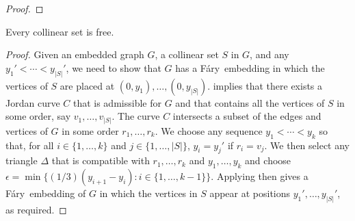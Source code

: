 \documentclass{patmorin}
\newcommand{\Fary}{Fáry}
\begin{document}
\begin{proof}
%
\end{proof}

\begin{cor}
  Every collinear set is free.
\end{cor}

\begin{proof}
   Given an embedded graph $G$, a collinear set $S$ in $G$,
   and any $y_1'<\cdots<y_{|S|}'$, we need to show that $G$ has
   a \Fary\ embedding in which the vertices of $S$ are placed at
   $(0,y_1),\ldots,(0,y_{|S|})$.   implies
   that there exists a Jordan curve $C$ that is admissible for $G$
   and that contains all the vertices of $S$ in some order, say
   $v_1,\ldots,v_{|S|}$.  The curve $C$ intersects a subset of the edges
   and vertices of $G$ in some order $r_1,\ldots,r_k$.  We choose any
   sequence $y_1<\cdots<y_k$ so that, for all $i\in\{1,\ldots,k\}$ and
   $j\in\{1,\ldots,|S|\}$, $y_i = y_j'$ if $r_i=v_j$.  We then select
   any triangle $\Delta$ that is compatible with $r_1,\ldots,r_k$ and
   $y_1,\ldots,y_k$ and choose $\epsilon = \min\{(1/3)(y_{i+1}-y_{i}):
   i\in\{1,\ldots,k-1\}\}$.  Applying  then gives a \Fary\
   embedding of $G$ in which the vertices in $S$ appear at positions
   $y_1',\ldots,y_{|S|}'$, as required.
\end{proof}
\end{document}
